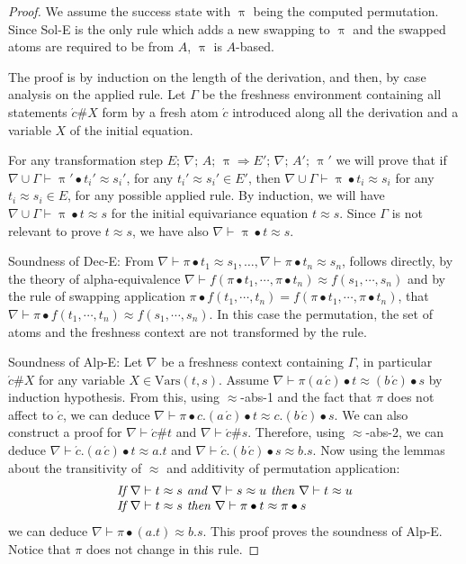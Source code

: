 \documentclass[11pt,a4paper]{amsart}
\theoremstyle{definition}
\newcommand{\Lra}{\Longrightarrow}
\newcommand{\vars}{\mathrm{Vars}}
\newcommand{\perm}{\approx}
\newcommand{\permef}{\bullet}
\newcommand\ppi{\uppi}
\newcommand{\fresh}[1]{{\acute{#1}}}
\newcommand{\Atoms}{A}
\newcommand{\nablai}{{\nabla}}
\begin{document}
\begin{proof}
We assume the success state with $\ppi$ being the computed
permutation.  Since {\sf Sol-E} is the only rule which adds a new
swapping to $\ppi$ and the swapped atoms are required to be from
$\Atoms$, $\ppi$ is $\Atoms$-based.

The proof is by induction on the length of the derivation, and then,
by case analysis on the applied rule. Let $\Gamma$ be the freshness
environment containing all statements $\fresh{c}\#X$ form by a fresh atom
$\fresh{c}$ introduced along all the derivation and a variable $X$ of the
initial equation.

For any transformation step $ E ;\,\allowbreak \nablai ;\,\allowbreak
\Atoms ;\,\allowbreak \ppi \Lra E' ;\, \nablai;\, \Atoms' ;\, \ppi'$
we will prove that if $\nablai\cup\Gamma\vdash\ppi'\permef t_i'\approx
s_i'$, for any $t_i'\perm s_i'\in E'$, then
$\nablai\cup\Gamma\vdash\ppi\permef t_i\approx s_i$ for any $t_i\perm
s_i\in E$, for any possible applied rule. By induction, we will have
$\nablai\cup\Gamma\vdash\ppi\permef t\approx s$ for the initial
equivariance equation $t\perm s$.  Since $\Gamma$ is not relevant to
prove $t\approx s$, we have also $\nablai\vdash\ppi\permef t\approx
s$.

Soundness of {\sf Dec-E}: From $\nablai\vdash
\pi\permef t_1\approx s_1,\dots, \nablai\vdash \pi\permef t_n\approx
s_n$, follows directly, by the theory of alpha-equivalence
$\nablai\vdash f(\pi\permef t_1,\cdots,\pi\permef t_n) \approx
f(s_1,\cdots,s_n)$ and by the rule of swapping application
$\pi\permef f(t_1,\cdots,t_n)=f(\pi\permef t_1,\cdots,\pi\permef
t_n)$, that $\nablai\vdash \pi\permef f(t_1,\cdots,t_n) \approx
f(s_1,\cdots,s_n)$. In this case the permutation, the set of atoms and
the freshness context are not transformed by the rule.

Soundness of {\sf Alp-E}:  Let $\nabla$ be a
freshness context containing $\Gamma$, in particular $\fresh{c}\#X$
for any variable $X\in\vars(t,s)$. Assume $\nabla\vdash \pi(a\,
\fresh{c})\permef t \approx (b\, \fresh{c})\permef s$ by induction
hypothesis. From this, using $\approx$-abs-1 and the fact that $\pi$
does not affect to $\fresh{c}$, we can deduce $\nabla\vdash\pi\permef
c.(a\, \fresh{c})\permef t \approx c.(b\, \fresh{c})\permef s$.  We
can also construct a proof for $\nabla\vdash \fresh{c}\# t$ and
$\nabla\vdash\fresh{c}\# s$.  Therefore, using $\approx$-abs-2, we can
deduce $\nabla\vdash \fresh{c}.(a\, \fresh{c})\permef t \approx a.t$
and $\nabla\vdash \fresh{c}.(b\, \fresh{c})\permef s \approx b.s$.
Now using the lemmas about the transitivity of $\approx$ and additivity
of permutation application:
$$
\begin{array}{l}
\mbox{\it If $\nabla\vdash t\approx s$ and $\nabla\vdash s\approx u$ then $\nabla\vdash t\approx u$}\\
\mbox{\it If $\nabla\vdash t\approx s$ then $\nabla\vdash \pi\permef t\approx \pi\permef s$}
\end{array}
$$ 
we can deduce $\nabla\vdash \pi\permef (a.t) \approx b.s$.  This
proof proves the soundness of {\sf Alp-E}. Notice that $\pi$ does not
change in this rule.


\end{proof}
\end{document}

